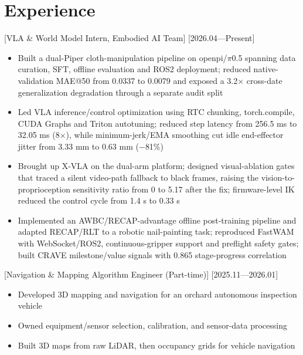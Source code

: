 \documentclass{resume-photo}
\begin{document}
\section{Experience}

[\textnormal{VLA \& World Model Intern, Embodied AI Team}]
[2026.04—Present]

\begin{itemize}
  \item Built a dual-Piper cloth-manipulation pipeline on openpi/$\pi$0.5 spanning data curation, SFT, offline evaluation and ROS2 deployment; reduced native-validation MAE@50 from 0.0337 to 0.0079 and exposed a 3.2$\times$ cross-date generalization degradation through a separate audit split
  \item Led VLA inference/control optimization using RTC chunking, torch.compile, CUDA Graphs and Triton autotuning; reduced step latency from 256.5 ms to 32.05 ms (8$\times$), while minimum-jerk/EMA smoothing cut idle end-effector jitter from 3.33 mm to 0.63 mm ($-$81\%)
  \item Brought up X-VLA on the dual-arm platform; designed visual-ablation gates that traced a silent video-path fallback to black frames, raising the vision-to-proprioception sensitivity ratio from 0 to 5.17 after the fix; firmware-level IK reduced the control cycle from 1.4 s to 0.33 s
  \item Implemented an AWBC/RECAP-advantage offline post-training pipeline and adapted RECAP/RLT to a robotic nail-painting task; reproduced FastWAM with WebSocket/ROS2, continuous-gripper support and preflight safety gates; built CRAVE milestone/value signals with 0.865 stage-progress correlation
\end{itemize}

[\textnormal{Navigation \& Mapping Algorithm Engineer (Part-time)}]
[2025.11—2026.01]

\begin{itemize}
  \item Developed 3D mapping and navigation for an orchard autonomous inspection vehicle
  \item Owned equipment/sensor selection, calibration, and sensor-data processing
  \item Built 3D maps from raw LiDAR, then occupancy grids for vehicle navigation
\end{itemize}
\end{document}
